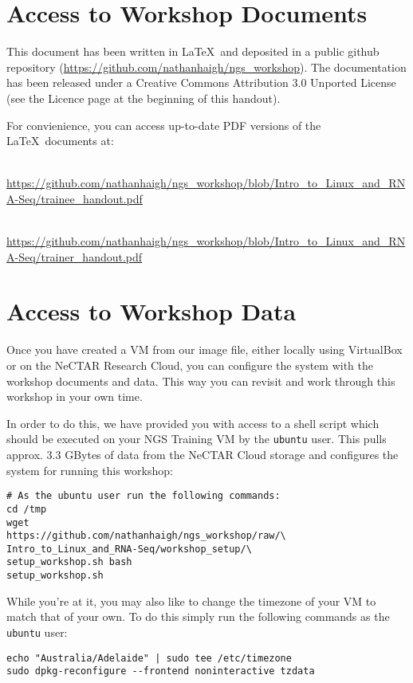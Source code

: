\section{Access to Workshop Documents}

This document has been written in \LaTeX\ and deposited in a public github
repository (\url{https://github.com/nathanhaigh/ngs_workshop}). The
documentation has been released under a Creative Commons Attribution 3.0
Unported License (see the Licence page at the beginning of this handout).

For convienience, you can access up-to-date PDF versions of the \LaTeX\ documents at:
\begin{description}[style=multiline,labelindent=0cm,align=left,leftmargin=0.5cm]
\item[Trainee Handout]\hfill\\
\url{https://github.com/nathanhaigh/ngs_workshop/blob/Intro_to_Linux_and_RNA-Seq/trainee_handout.pdf}
\item[Trainer Handout]\hfill\\
\url{https://github.com/nathanhaigh/ngs_workshop/blob/Intro_to_Linux_and_RNA-Seq/trainer_handout.pdf}
\end{description}

\section{Access to Workshop Data}
Once you have created a VM from our image file, either locally using VirtualBox
or on the NeCTAR Research Cloud, you can configure the system with the workshop
documents and data. This way you can revisit and work through this workshop in
your own time.

In order to do this, we have provided you with access to a shell script which
should be executed on your NGS Training VM by the \texttt{ubuntu} user. This pulls
approx. 3.3 GBytes of data from the NeCTAR Cloud storage and configures the system
for running this workshop:

\begin{lstlisting}
# As the ubuntu user run the following commands:
cd /tmp
wget
https://github.com/nathanhaigh/ngs_workshop/raw/\
Intro_to_Linux_and_RNA-Seq/workshop_setup/\
setup_workshop.sh bash
setup_workshop.sh
\end{lstlisting}

While you're at it, you may also like to change the timezone of your VM to match
that of your own. To do this simply run the following commands as the
\texttt{ubuntu} user:
\begin{lstlisting}
echo "Australia/Adelaide" | sudo tee /etc/timezone
sudo dpkg-reconfigure --frontend noninteractive tzdata
\end{lstlisting}


